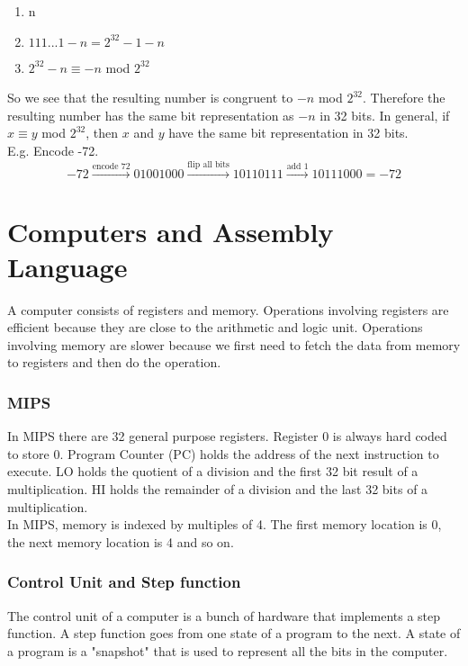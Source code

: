 \documentclass[12pt, letterpaper]{article}
\begin{document}
\begin{enumerate}
\item n
\item \(1 1 1 ... 1 - n = 2^{32} - 1 - n\) 
\item \(2^{32} - n \equiv -n\) mod \(2^{32}\) 
\end{enumerate}

So we see that the resulting number is congruent to \(-n\) mod \(2^{32}\). Therefore the resulting number has the same bit representation as \(-n\) in 32 bits. In general, if \(x \equiv y\) mod \(2^{32}\), then \(x\) and \(y\) have the same bit representation in 32 bits.\\

E.g. Encode -72.
\[-72 \xrightarrow{\text{encode 72}} 01001000 \xrightarrow{\text{flip all bits}} 10110111 \xrightarrow{\text{add 1}} 10111000 = -72\]

\section{Computers and Assembly Language}
A computer consists of registers and memory. Operations involving registers are efficient because they are close to the arithmetic and logic unit. Operations involving memory are slower because we first need to fetch the data from memory to registers and then do the operation.

\subsubsection{MIPS}
In MIPS there are 32 general purpose registers. Register 0 is always hard coded to store 0. Program Counter (PC) holds the address of the next instruction to execute. LO holds the quotient of a division and the first 32 bit result of a multiplication. HI holds the remainder of a division and the last 32 bits of a multiplication.\\

In MIPS, memory is indexed by multiples of 4. The first memory location is 0, the next memory location is 4 and so on.

\subsubsection{Control Unit and Step function}
The control unit of a computer is a bunch of hardware that implements a step function. A step function goes from one state of a program to the next. A state of a program is a "snapshot" that is used to represent all the bits in the computer.\\
\end{document}
